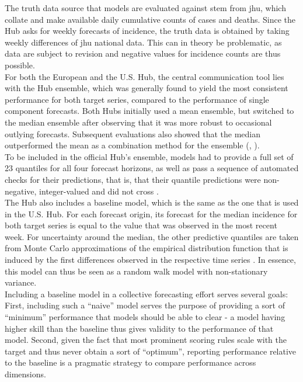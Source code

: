 The truth data source that models are evaluated against stem from \ac{jhu}, which collate and make available daily cumulative counts of cases and deaths. Since the Hub asks for weekly forecasts of incidence, the truth data is obtained by taking weekly differences of \ac{jhu} national data. This can in theory be problematic, as data are subject to revision and negative values for incidence counts are thus possible.\\
For both the European and the U.S. Hub, the central communication tool lies with the Hub ensemble, which was generally found to yield the most consistent performance for both target series, compared to the performance of single component forecasts. Both Hubs initially used a mean ensemble, but switched to the median ensemble after observing that it was more robust to occasional outlying forecasts. Subsequent evaluations also showed that the median outperformed the mean as a combination method for the ensemble (\cite{sherratt_european_2022}, \cite{ray_comparing_2022}). \\
To be included in the official Hub's ensemble, models had to provide a full set of 23 quantiles for all four forecast horizons, as well as pass a sequence of automated checks for their predictions, that is, that their quantile predictions were non-negative, integer-valued and did not cross \citep{sherratt_european_2022}.\\
The Hub also includes a baseline model, which is the same as the one that is used in the U.S. Hub. For each forecast origin, its forecast for the median incidence for both target series is equal to the value that was observed in the most recent week. For uncertainty around the median, the other predictive quantiles are taken from Monte Carlo approximations of the empirical distribution function that is induced by the first differences observed in the respective time series \citep{cramer_evaluation_2022}. In essence, this model can thus be seen as a random walk model with non-stationary variance.\\
Including a baseline model in a collective forecasting effort serves several goals: First, including such a ``naive'' model serves the purpose of providing a sort of ``minimum'' performance that models should be able to clear - a model having higher skill than the baseline thus gives validity to the performance of that model. Second, given the fact that most prominent scoring rules scale with the target and thus never obtain a sort of ``optimum'', reporting performance relative to the baseline is a pragmatic strategy to compare performance across dimensions.%
